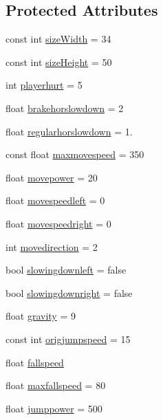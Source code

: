 \subsection*{Protected Attributes}
\begin{DoxyCompactItemize}
\item 
const int \hyperlink{classPlayerObject_a8c608e72f443704dcbbd2856c677d7ae}{size\+Width} = 34
\item 
const int \hyperlink{classPlayerObject_af89c0c451568d673a7d81ebfd9d71605}{size\+Height} = 50
\item 
int \hyperlink{classPlayerObject_ae033dcf570f627c5b2a0286b882e8c21}{playerhurt} = 5
\item 
float \hyperlink{classPlayerObject_a7f3a2004c470db8c3013143f0dca1070}{brakehorslowdown} = 2
\item 
float \hyperlink{classPlayerObject_a925251c105714f50f384a9ab4039a961}{regularhorslowdown} = 1.
\item 
const float \hyperlink{classPlayerObject_a8b2f3724844592cb856020805ec30cec}{maxmovespeed} = 350
\item 
float \hyperlink{classPlayerObject_a95107fdb81d2094f9f0255908e3dfbf3}{movepower} = 20
\item 
float \hyperlink{classPlayerObject_a0215c8600251b36a27d49bd6b01d34bb}{movespeedleft} = 0
\item 
float \hyperlink{classPlayerObject_aabfd7e3dac7eaa6851528fdefc65c734}{movespeedright} = 0
\item 
int \hyperlink{classPlayerObject_a1f0041d3a3195f684e002534329afdd2}{movedirection} = 2
\item 
bool \hyperlink{classPlayerObject_a4894d3619cdf5cb0c35c480aa89502a4}{slowingdownleft} = false
\item 
bool \hyperlink{classPlayerObject_a3f5b7c904edac7e254297849659d01b3}{slowingdownright} = false
\item 
float \hyperlink{classPlayerObject_ac066dbdd99349fc992e701bfa3a344b1}{gravity} = 9
\item 
const int \hyperlink{classPlayerObject_a352711ae9a2f07845e69a6a345b2e341}{origjumpspeed} = 15
\item 
float \hyperlink{classPlayerObject_a37c477ff51a290d74dba382079474340}{fallspeed}
\item 
float \hyperlink{classPlayerObject_a657f15307fb36294d4fc5f38a37edc22}{maxfallspeed} = 80
\item 
float \hyperlink{classPlayerObject_a3f83ebd349e87ef690ad69e88cf1b9a0}{jumppower} = 500
\item 

\end{DoxyCompactItemize}
